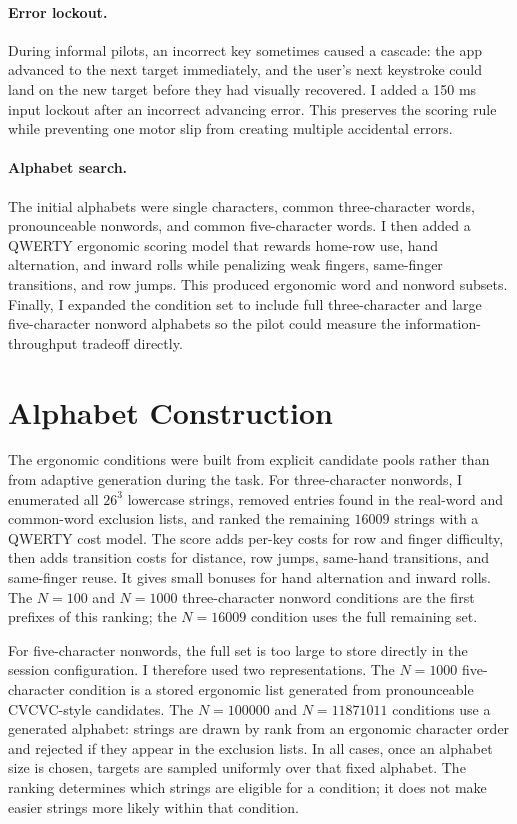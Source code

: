 \documentclass[11pt]{article}
\begin{document}
\paragraph{Error lockout.}
During informal pilots, an incorrect key sometimes caused a cascade: the app advanced to the next target immediately, and the user's next keystroke could land on the new target before they had visually recovered. I added a 150 ms input lockout after an incorrect advancing error. This preserves the scoring rule while preventing one motor slip from creating multiple accidental errors.

\paragraph{Alphabet search.}
The initial alphabets were single characters, common three-character words, pronounceable nonwords, and common five-character words. I then added a QWERTY ergonomic scoring model that rewards home-row use, hand alternation, and inward rolls while penalizing weak fingers, same-finger transitions, and row jumps. This produced ergonomic word and nonword subsets. Finally, I expanded the condition set to include full three-character and large five-character nonword alphabets so the pilot could measure the information-throughput tradeoff directly.

\section{Alphabet Construction}

The ergonomic conditions were built from explicit candidate pools rather than from adaptive generation during the task. For three-character nonwords, I enumerated all \(26^3\) lowercase strings, removed entries found in the real-word and common-word exclusion lists, and ranked the remaining \(16009\) strings with a QWERTY cost model. The score adds per-key costs for row and finger difficulty, then adds transition costs for distance, row jumps, same-hand transitions, and same-finger reuse. It gives small bonuses for hand alternation and inward rolls. The \(N=100\) and \(N=1000\) three-character nonword conditions are the first prefixes of this ranking; the \(N=16009\) condition uses the full remaining set.

For five-character nonwords, the full set is too large to store directly in the session configuration. I therefore used two representations. The \(N=1000\) five-character condition is a stored ergonomic list generated from pronounceable CVCVC-style candidates. The \(N=100000\) and \(N=11871011\) conditions use a generated alphabet: strings are drawn by rank from an ergonomic character order and rejected if they appear in the exclusion lists. In all cases, once an alphabet size is chosen, targets are sampled uniformly over that fixed alphabet. The ranking determines which strings are eligible for a condition; it does not make easier strings more likely within that condition.
\end{document}
